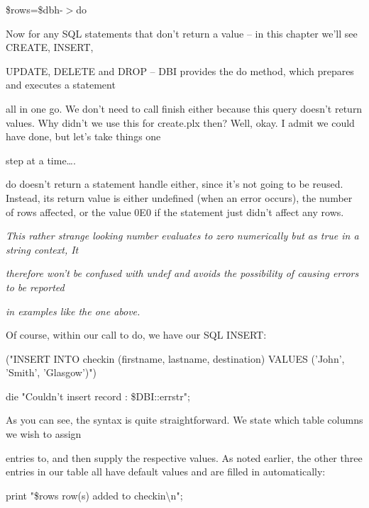 \documentclass[a4paper,11pt]{book}
\begin{document}
\noindent \$rows=\$dbh-$>$do

\noindent 

\noindent Now for any SQL statements that don't return a value -- in this chapter we'll see CREATE, INSERT,

\noindent UPDATE, DELETE and DROP -- DBI provides the do method, which prepares and executes a statement

\noindent all in one go. We don't need to call finish either because this query doesn't return values. Why didn't we use this for create.plx then? Well, okay. I admit we could have done, but let's take things one

\noindent step at a time\dots .

\noindent 

\noindent do doesn't return a statement handle either, since it's not going to be reused. Instead, its return value is either undefined (when an error occurs), the number of rows affected, or the value 0E0 if the statement just didn't affect any rows.

\noindent 

\noindent \textit{This rather strange looking number evaluates to zero numerically but as true in a string context, It}

\noindent \textit{therefore won't be confused with undef and avoids the possibility of causing errors to be reported}

\noindent \textit{in examples like the one above.}

\noindent 

\noindent Of course, within our call to do, we have our SQL INSERT:

\noindent 

\noindent ("INSERT INTO checkin (firstname, lastname, destination) VALUES ('John', 'Smith',  'Glasgow')")

\noindent \textbar \textbar  die "Couldn't insert record : \$DBI::errstr";

\noindent 

\noindent As you can see, the syntax is quite straightforward. We state which table columns we wish to assign

\noindent entries to, and then supply the respective values. As noted earlier, the other three entries in our table all have default values and are filled in automatically:

\noindent 

\noindent print "\$rows row(s) added to checkin\textbackslash n";
\end{document}
